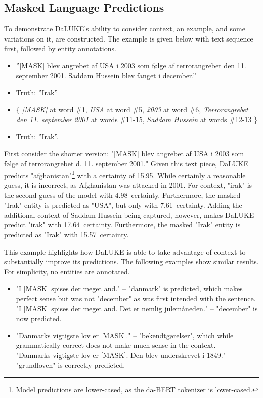\documentclass[main.tex]{subfiles}
\begin{document}
\subsection{Masked Language Predictions}
\label{subsec:mlmpreds}
To demonstrate DaLUKE's ability to consider context, an example, and some variations on it, are constructed.
The example is given below with text sequence first, followed by entity annotations.
\begin{itemize}
    \item ''[MASK] blev angrebet af USA i 2003 som følge af terrorangrebet den 11. september 2001. Saddam Hussein blev fanget i december.''
    \item[] Truth: ''Irak''
    \item $\{$ \emph{[MASK]} at word \#1,
            \subitem \emph{USA} at word \#5,
            \subitem \emph{2003} at word \#6,
            \subitem \emph{Terrorangrebet den 11. september 2001} at words \#11-15,
            \subitem \emph{Saddam Hussein} at words \#12-13
        $\}$
    \item[] Truth: ''Irak''.
\end{itemize}
First consider the shorter version: "[MASK] blev angrebet af USA i 2003 som følge af terrorangrebet d. 11. september 2001."
Given this text piece, DaLUKE predicts "afghanistan"\footnote{Model predictions are lower-cased, as the da-BERT tokenizer is lower-cased.} with a certainty of 15.95\pro.
While certainly a reasonable guess, it is incorrect, as Afghanistan was attacked in 2001.
For context, "irak" is the second guess of the model with 4.98\pro\ certainty.
Furthermore, the masked "Irak" entity is predicted as "USA", but only with 7.61\pro~certainty.
Adding the additional context of Saddam Hussein being captured, however, makes DaLUKE predict "irak" with 17.64\pro~certainty.
Furthermore, the masked "Irak" entity is predicted as "Irak" with 15.57\pro~certainty.

This example highlights how DaLUKE is able to take advantage of context to substantially improve its predictions.
The following examples show similar results.
For simplicity, no entities are annotated.
\begin{itemize}
    \item "I [MASK] spises der meget and." -- "danmark" is predicted, which makes perfect sense but was not "december" as was first intended with the sentence.\\
    "I [MASK] spises der meget and. Det er nemlig julemåneden." -- "december" is now predicted.
    \item "Danmarks vigtigste lov er [MASK]." -- "bekendtgørelser", which while grammatically correct does not make much sense in the context.\\
    "Danmarks vigtigste lov er [MASK]. Den blev underskrevet i 1849." -- "grundloven" is correctly predicted.
\end{itemize}
\end{document}
